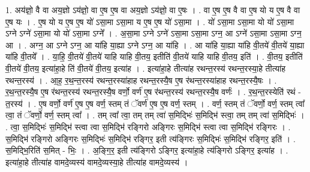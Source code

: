 \documentclass[17pt]{extarticle}
\begin{document}
1. अय॑ज्ञो॒ वै वा अय॒ज्ञो ऽय॑ज्ञो॒ वा ए॒ष ए॒ष वा अय॒ज्ञो ऽय॑ज्ञो॒ वा ए॒षः । . वा ए॒ष ए॒ष वै वा ए॒ष यो य ए॒ष वै वा ए॒ष यः । . ए॒ष यो य ए॒ष ए॒ष यो॑ ऽसा॒मा ऽसा॒मा य ए॒ष ए॒ष यो॑ ऽसा॒मा । . यो॑ ऽसा॒मा ऽसा॒मा यो यो॑ ऽसा॒मा ऽग्ने ऽग्ने॑ ऽसा॒मा यो यो॑ ऽसा॒मा ऽग्ने᳚ । . अ॒सा॒मा ऽग्ने ऽग्ने॑ ऽसा॒मा ऽसा॒मा ऽग्न॒ आ ऽग्ने॑ ऽसा॒मा ऽसा॒मा ऽग्न॒ आ । . अग्न॒ आ ऽग्ने ऽग्न॒ आ या॑हि या॒ह्या ऽग्ने ऽग्न॒ आ या॑हि । . आ या॑हि या॒ह्या या॑हि वी॒तये॑ वी॒तये॑ या॒ह्या या॑हि वी॒तये᳚ । . या॒हि॒ वी॒तये॑ वी॒तये॑ याहि याहि वी॒तय॒ इतीति॑ वी॒तये॑ याहि याहि वी॒तय॒ इति॑ । . वी॒तय॒ इतीति॑ वी॒तये॑ वी॒तय॒ इत्या॑हा॒हे ति॑ वी॒तये॑ वी॒तय॒ इत्या॑ह । . इत्या॑हा॒हे तीत्या॑ह रथन्त॒रस्य॑ रथन्त॒रस्या॒हे तीत्या॑ह रथन्त॒रस्य॑ । . आ॒ह॒ र॒थ॒न्त॒रस्य॑ रथन्त॒रस्या॑हाह रथन्त॒रस्यै॒ष ए॒ष र॑थन्त॒रस्या॑हाह रथन्त॒रस्यै॒षः । . र॒थ॒न्त॒रस्यै॒ष ए॒ष र॑थन्त॒रस्य॑ रथन्त॒रस्यै॒ष वर्णो॒ वर्ण॑ ए॒ष र॑थन्त॒रस्य॑ रथन्त॒रस्यै॒ष वर्णः॑ । . र॒थ॒न्त॒रस्येति॑ रथं - त॒रस्य॑ । . ए॒ष वर्णो॒ वर्ण॑ ए॒ष ए॒ष वर्ण॒ स्तम् तं ॅवर्ण॑ ए॒ष ए॒ष वर्ण॒ स्तम् । . वर्ण॒ स्तम् तं ॅवर्णो॒ वर्ण॒ स्तम् त्वा᳚ त्वा॒ तं ॅवर्णो॒ वर्ण॒ स्तम् त्वा᳚ । . तम् त्वा᳚ त्वा॒ तम् तम् त्वा॑ स॒मिद्भिः॑ स॒मिद्भि॑ स्त्वा॒ तम् तम् त्वा॑ स॒मिद्भिः॑ । . त्वा॒ स॒मिद्भिः॑ स॒मिद्भि॑ स्त्वा त्वा स॒मिद्भि॑ रङ्गिरो अङ्गिरः स॒मिद्भि॑ स्त्वा त्वा स॒मिद्भि॑ रङ्गिरः । . स॒मिद्भि॑ रङ्गिरो अङ्गिरः स॒मिद्भिः॑ स॒मिद्भि॑ रङ्गिर॒ इती त्य॑ङ्गिरः स॒मिद्भिः॑ स॒मिद्भि॑ रङ्गिर॒ इति॑ । . स॒मिद्भि॒रिति॑ स॒मित् - भिः॒ । . अ॒ङ्गि॒र॒ इती त्य॑ङ्गिरो ऽङ्गिर॒ इत्या॑हा॒हे त्य॑ङ्गिरो ऽङ्गिर॒ इत्या॑ह । . इत्या॑हा॒हे तीत्या॑ह वामदे॒व्यस्य॑ वामदे॒व्यस्या॒हे तीत्या॑ह वामदे॒व्यस्य॑ । \newline
\end{document}
